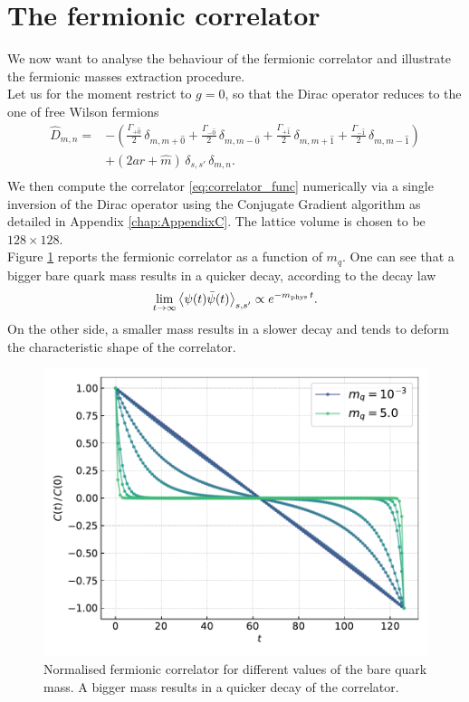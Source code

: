 \section{The fermionic correlator}
We now want to analyse the behaviour of the fermionic correlator and illustrate the fermionic masses extraction procedure. \\
Let us for the moment restrict to $g = 0$, so that the Dirac operator reduces to the one of free Wilson fermions 
\begin{equation}
    \begin{aligned}
    \widehat{D}_{m, n} = &- \left(\frac{\Gamma_{+\hat 0}}{2} \, \delta_{m, m+\hat 0} +\frac{\Gamma_{-\hat 0}}{2} \, \delta_{m, m-\hat 0} + \frac{\Gamma_{+\hat 1}}{2} \, \delta_{m, m+\hat 1} + \frac{\Gamma_{- \hat 1}}{2} \, \delta_{m, m-\hat 1}\right)  \\
     &+ \left(2ar + \hat m \right) \, \delta_{s,s'} \, \delta_{m,n}. \\
    \end{aligned}
    \label{eq:wilson-dirac_operator_free}
\end{equation}
We then compute the correlator \eqref{eq:correlator_func} numerically via a single inversion of the Dirac operator using the Conjugate Gradient algorithm as detailed in Appendix \ref{chap:AppendixC}. The lattice volume is chosen to be $128 \times 128$. \\
Figure \ref{fig:correlator_mass} reports the fermionic correlator as a function of $m_q$. One can see that a bigger bare quark mass results in a quicker decay, according to the decay law 
\begin{equation}
    \lim_{t \to \infty} \left\langle \psi(t)\bar\psi(t) \right\rangle_{s,s'} \propto e^{-m_\text{phys} \, t}.
    \label{eq:decay_law_correlator}
\end{equation}
On the other side, a smaller mass results in a slower decay and tends to deform the characteristic shape of the correlator.
\begin{figure}[h]
    \centering 
    \includegraphics[scale=0.6]{figures/correlator/correlator.pdf}
    \caption[Fermionic correlator]{Normalised fermionic correlator for different values of the bare quark mass. A bigger mass results in a quicker decay of the correlator.}
    \label{fig:correlator_mass}
\end{figure}\\
